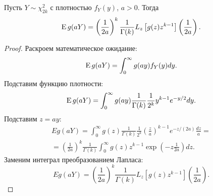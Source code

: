 \documentclass[../paper.tex]{subfiles}
\begin{document}
\begin{Lem}
\label{chisq-laplace}
Пусть $Y \sim \chi^2_{2k}$ с плотностью $f_Y(y)$, $a > 0$.
Тогда
\[
	\operatorname{E} g(aY) = \left(\frac{1}{2a}\right)^k \frac{1}{\Gamma(k)} L_z \left[ g(z) z^{k-1}  \right] \left( \frac{1}{2a} \right) 
.\]
\end{Lem}
\begin{proof}
Раскроем математическое ожидание:
\[
	\operatorname{E} g(aY) = \int_{0}^{\infty} g(ay) f_Y(y) dy  
.\]
Подставим функцию плотности:
\[
	\operatorname{E} g(aY) = \int_{0}^{\infty} g(ay) \frac{1}{\Gamma(k)} \frac{1}{2^k} y^{k-1} e^{-y/2} dy 
.\]
Подставим $z = ay$:
\begin{multline*}
	Eg(aY)
	= \int_0^\infty g(z) \frac{1}{\Gamma(k)} \frac{1}{2^k} \left( \frac{z}{a} \right)^{k-1} e^{-z/(2a)} \frac{dz}{a}
	=\\= \left( \frac{1}{2a} \right)^k \frac{1}{\Gamma(k)} \int_{0}^{\infty} g(z) z^{k-1} \exp\left(-z \frac{1}{2a}\right) dz
.\end{multline*}
Заменим интеграл преобразованием Лапласа:
\[
	Eg(aY)
	= \left( \frac{1}{2a} \right)^k \frac{1}{\Gamma(k)} L_z \left[ g(z) z^{k-1} \right] \left( \frac{1}{2a} \right) 
.\]
\end{proof}
\end{document}

